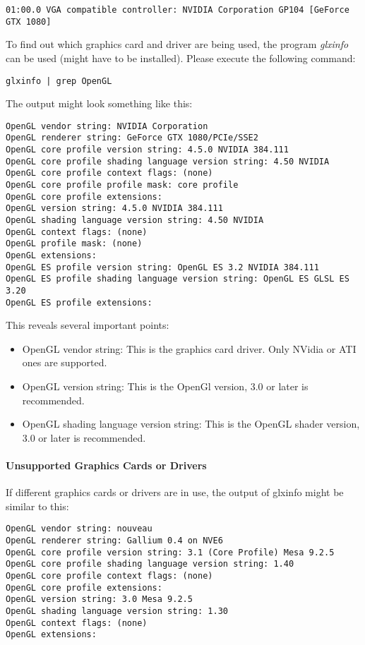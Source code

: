 \begin{lstlisting}
01:00.0 VGA compatible controller: NVIDIA Corporation GP104 [GeForce GTX 1080]
\end{lstlisting}

To find out which graphics card and driver are being used, the program \textit{glxinfo} can be used (might have to be installed). Please execute the following command:

\begin{lstlisting}
glxinfo | grep OpenGL
\end{lstlisting}

The output might look something like this:

\begin{lstlisting}
OpenGL vendor string: NVIDIA Corporation
OpenGL renderer string: GeForce GTX 1080/PCIe/SSE2
OpenGL core profile version string: 4.5.0 NVIDIA 384.111
OpenGL core profile shading language version string: 4.50 NVIDIA
OpenGL core profile context flags: (none)
OpenGL core profile profile mask: core profile
OpenGL core profile extensions:
OpenGL version string: 4.5.0 NVIDIA 384.111
OpenGL shading language version string: 4.50 NVIDIA
OpenGL context flags: (none)
OpenGL profile mask: (none)
OpenGL extensions:
OpenGL ES profile version string: OpenGL ES 3.2 NVIDIA 384.111
OpenGL ES profile shading language version string: OpenGL ES GLSL ES 3.20
OpenGL ES profile extensions:
\end{lstlisting}

This reveals several important points:

\begin{itemize}  
\item OpenGL vendor string: This is the graphics card driver. Only NVidia or ATI ones are supported.
\item OpenGL version string: This is the OpenGl version, 3.0 or later is recommended.
\item OpenGL shading language version string: This is the OpenGL shader version, 3.0 or later is recommended.
\end{itemize}

\paragraph{Unsupported Graphics Cards or Drivers}

If different graphics cards or drivers are in use, the output of glxinfo might be similar to this:

\begin{lstlisting}
OpenGL vendor string: nouveau
OpenGL renderer string: Gallium 0.4 on NVE6
OpenGL core profile version string: 3.1 (Core Profile) Mesa 9.2.5
OpenGL core profile shading language version string: 1.40
OpenGL core profile context flags: (none)
OpenGL core profile extensions:
OpenGL version string: 3.0 Mesa 9.2.5
OpenGL shading language version string: 1.30
OpenGL context flags: (none)
OpenGL extensions:
\end{lstlisting}

